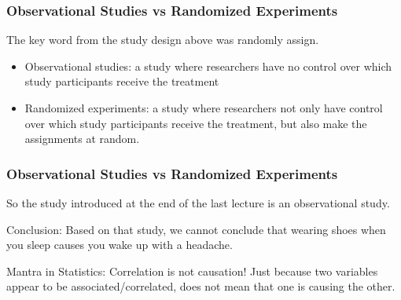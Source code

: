 \documentclass[slides]{beamer}\usepackage[]{graphicx}\usepackage[]{color}
\newcommand{\blue}[1]{\textcolor{blue2}{#1}}
\begin{document}
\begin{frame}
\frametitle{Observational Studies vs Randomized Experiments}
The key word from the study design above was \blue{randomly assign}.

\begin{itemize}
  \pause\item \blue{Observational studies}: a study where researchers have \blue{no control} over which study participants receive the treatment
  \pause\item \blue{Randomized experiments}: a study where researchers not only have control over which study participants receive the treatment, but also make the assignments \blue{at random}.
\end{itemize}

\end{frame}


\begin{frame}
\frametitle{Observational Studies vs Randomized Experiments}
So the study introduced at the end of the last lecture is an \blue{observational study}.

\vspace{0.5cm}

\pause\blue{Conclusion}:  Based on that study, we cannot conclude that wearing shoes when you sleep \blue{causes} you wake up with a headache.

\vspace{0.5cm}

\pause\blue{Mantra in Statistics}:  \blue{Correlation is not causation!}  Just because two variables appear to be associated/correlated, does not mean that one is \blue{causing the other}.

\end{frame}
\end{document}
